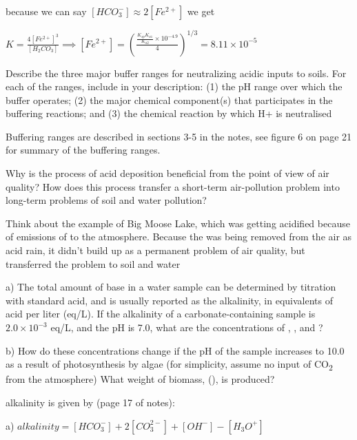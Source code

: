 \documentclass[addpoints,12pt]{exam}
\begin{document}
\begin{questions}
\begin{solution}
{ because we can say \([HCO_3^-] \approx 2[Fe^{2+}]\) we get
 
 \(K = \frac{4[Fe^{2+}]^3}{[H_2CO_3]} \implies [Fe^{2+}] = \left(\frac{\frac{K_{sp}K_{a1}}{K_{a2}}\times 10^{-4.9}}{4}\right)^{1/3}=8.11\times10^{-5}\)
 }
 \end{solution}
 
\question
Describe the three major buffer ranges for neutralizing acidic inputs to soils. For each of the ranges, include in your description: (1) the pH range over which the buffer operates; (2) the major chemical component(s) that participates in the buffering reactions; and (3) the chemical reaction by which H+ is neutralised

\begin{solution} {\color{red}
Buffering ranges are described in sections 3-5 in the notes, see figure 6 on page 21 for summary of the buffering ranges.
}
\end{solution}

\question
Why is the process of acid deposition beneficial from the point of view of air quality? How does this process transfer a short-term air-pollution problem into long-term problems of soil and water pollution?

\begin{solution} {\color{red}
Think about the example of Big Moose Lake, which was getting acidified because of emissions of  to the atmosphere. Because the  was being removed from the air as acid rain, it didn't build up as a permanent problem of air quality, but transferred the problem to soil and water
}
\end{solution}

\question
a) The total amount of base in a water sample can be determined by titration with standard acid, and is usually reported as the alkalinity, in equivalents of acid per liter (eq/L). If the alkalinity of a carbonate-containing sample is \(2.0 \times 10^{-3}\) eq/L, and the pH is 7.0, what are the concentrations of , ,  and ?
 

b) How do these concentrations change if the pH of the sample increases to 10.0 as a result of photosynthesis by algae (for simplicity, assume no input of CO\textsubscript{2} from the atmosphere) What weight of biomass, (), is produced?

\begin{solution} {\color{red}
alkalinity is given by (page 17 of notes):

a) \(alkalinity = [HCO_3^-] + 2[CO_3^{2-}] + [OH^-] - [H_3O^+]\)

}
\end{solution}
\end{questions}
\end{document}

